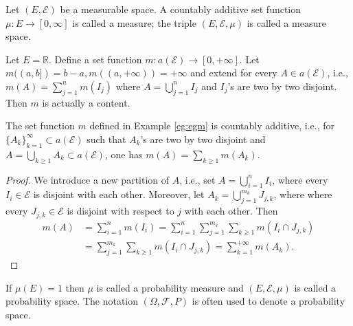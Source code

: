 \documentclass[11pt,singlecolumn, openany, citestyle=authoryear]{elegantbook}
\begin{document}
\begin{CJK}{UTF8}{gbsn}
\begin{definition}
    Let $(E, \mathcal{E})$ be a measurable space. 
    A countably additive set function $\mu : E \to [0,\infty]$ is called
    a measure; the triple $(E, \mathcal{E}, \mu)$ is called a measure space.
\end{definition}

\begin{example}\label{eg:egm}
    Let $E = \mathbb{R}$. Define a set function $m:a(\mathcal{E})\to [0,+\infty]$. Let 
    $m((a,b])=b-a, m((a,+\infty))=+\infty$ and extend for every $A \in a(\mathcal{E})$, i.e.,
    $\displaystyle m(A)=\sum_{j=1}^n m(I_j)$ where $\displaystyle A=\bigcup_{j=1}^n I_j$ and 
    $I_j$'s are two by two disjoint. Then $m$ is actually a content.
\end{example}

\begin{lemma}
    The set function $m$ defined in Example \ref{eg:egm} is countably additive, i.e.,
    for $\{A_k\}_{k=1}^\infty \subset a(\mathcal{E})$ such that $A_k$'s are two by two 
    disjoint and $\displaystyle A=\bigcup_{k\geqslant 1}A_k \subset a(\mathcal{E})$, one has 
    $m(A) = \displaystyle \sum_{k\geqslant 1}m(A_k)$.
\end{lemma}
\begin{proof}
    We introduce a new partition of $A$, i.e., set 
    $A = \displaystyle \bigcup_{i=1}^n I_i$, where every $I_i \in \mathcal{E}$ is disjoint 
    with each other. Moreover, let 
    $A_k = \displaystyle \bigcup_{j=1}^{m_k} J_{j,k}$, where where every $J_{j,k} \in \mathcal{E}$
    is disjoint with respect to $j$ with each other. Then 
    \begin{align*}
        m(A) &= \sum_{i=1}^n m(I_i) = \sum_{i=1}^n\sum_{j=1}^{m_k}\sum_{k\geqslant 1}
        m(I_i \cap J_{j,k})\\
        &= \sum_{j=1}^{m_k}\sum_{k\geqslant 1}m(I_i \cap J_{j,k}) = \sum_{k=1}^{+\infty}m(A_k).
    \end{align*}
\end{proof}


\begin{definition}
    If $\mu(E) = 1$ then $\mu$ is called a probability measure and $(E, \mathcal{E} , \mu)$ is called a probability space.
    The notation $(\Omega, \mathcal{F} , P)$ is often used to denote a probability space.
\end{definition}


\end{CJK}
\end{document}
